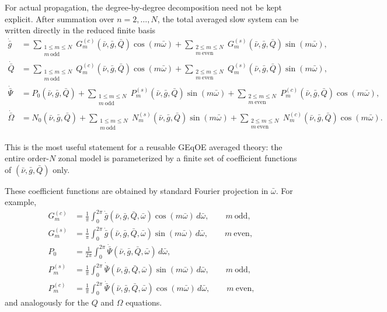 \documentclass[11pt]{article}
\begin{document}
For actual propagation, the degree-by-degree decomposition need not be kept
explicit. After summation over $n=2,\dots,N$, the total averaged slow system
can be written directly in the reduced finite basis
\begin{align}
\dot{\bar g}
&=
\sum_{\substack{1\le m\le N\\ m\ \mathrm{odd}}}
G^{(c)}_m(\bar\nu,\bar g,\bar Q)\cos(m\bar\omega)
+
\sum_{\substack{2\le m\le N\\ m\ \mathrm{even}}}
G^{(s)}_m(\bar\nu,\bar g,\bar Q)\sin(m\bar\omega),
\label{eq:gdot_total_N}\\
\dot{\bar Q}
&=
\sum_{\substack{1\le m\le N\\ m\ \mathrm{odd}}}
Q^{(c)}_m(\bar\nu,\bar g,\bar Q)\cos(m\bar\omega)
+
\sum_{\substack{2\le m\le N\\ m\ \mathrm{even}}}
Q^{(s)}_m(\bar\nu,\bar g,\bar Q)\sin(m\bar\omega),
\label{eq:Qdot_total_N}\\
\dot{\bar\Psi}
&=
P_0(\bar\nu,\bar g,\bar Q)
+
\sum_{\substack{1\le m\le N\\ m\ \mathrm{odd}}}
P^{(s)}_m(\bar\nu,\bar g,\bar Q)\sin(m\bar\omega)
+
\sum_{\substack{2\le m\le N\\ m\ \mathrm{even}}}
P^{(c)}_m(\bar\nu,\bar g,\bar Q)\cos(m\bar\omega),
\label{eq:Psidot_total_N}\\
\dot{\bar\Omega}
&=
N_0(\bar\nu,\bar g,\bar Q)
+
\sum_{\substack{1\le m\le N\\ m\ \mathrm{odd}}}
N^{(s)}_m(\bar\nu,\bar g,\bar Q)\sin(m\bar\omega)
+
\sum_{\substack{2\le m\le N\\ m\ \mathrm{even}}}
N^{(c)}_m(\bar\nu,\bar g,\bar Q)\cos(m\bar\omega).
\label{eq:Omegadot_total_N}
\end{align}

This is the most useful statement for a reusable GEqOE averaged theory: the
entire order-$N$ zonal model is parameterized by a finite set of coefficient
functions of $(\bar\nu,\bar g,\bar Q)$ only.

These coefficient functions are obtained by standard Fourier projection in
$\bar\omega$. For example,
\begin{align}
G^{(c)}_m
&=
\frac{1}{\pi}\int_0^{2\pi}
\dot{\bar g}(\bar\nu,\bar g,\bar Q,\bar\omega)\cos(m\bar\omega)\,d\bar\omega,
\qquad m\ \text{odd},
\label{eq:Gc_proj}\\
G^{(s)}_m
&=
\frac{1}{\pi}\int_0^{2\pi}
\dot{\bar g}(\bar\nu,\bar g,\bar Q,\bar\omega)\sin(m\bar\omega)\,d\bar\omega,
\qquad m\ \text{even},
\label{eq:Gs_proj}\\
P_0
&=
\frac{1}{2\pi}\int_0^{2\pi}
\dot{\bar\Psi}(\bar\nu,\bar g,\bar Q,\bar\omega)\,d\bar\omega,
\label{eq:P0_proj}\\
P^{(s)}_m
&=
\frac{1}{\pi}\int_0^{2\pi}
\dot{\bar\Psi}(\bar\nu,\bar g,\bar Q,\bar\omega)\sin(m\bar\omega)\,d\bar\omega,
\qquad m\ \text{odd},
\label{eq:Ps_proj}\\
P^{(c)}_m
&=
\frac{1}{\pi}\int_0^{2\pi}
\dot{\bar\Psi}(\bar\nu,\bar g,\bar Q,\bar\omega)\cos(m\bar\omega)\,d\bar\omega,
\qquad m\ \text{even},
\label{eq:Pc_proj}
\end{align}
and analogously for the $Q$ and $\Omega$ equations.
\end{document}
